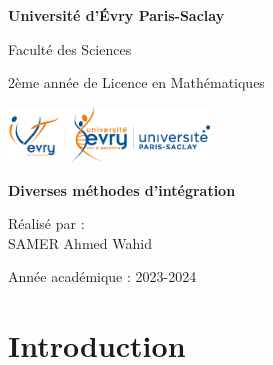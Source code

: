 \documentclass[12pt,a4paper]{article}
\begin{document}
\pagestyle{fancy}
	\renewcommand{\headrulewidth}{0.5pt}
    \fancyhead[L]{\chaptername\ \thechapter: \leftmark}

\begin{titlepage}
  \begin{center}

    \vspace*{1cm}

    \Large
    \textbf{Université d'Évry Paris-Saclay}

    \vspace{1.5cm}

    \large
    Faculté des Sciences

    \vspace{1.5cm}

    \large
    2ème année de Licence en Mathématiques

    \vspace{2cm}

    \includegraphics[width=0.4\textwidth]{logo_univ.png}

    \vspace{2cm}

    \Large
    \textbf{Diverses méthodes d’intégration}

    \vspace{2cm}

    \large
    Réalisé par :\\ SAMER Ahmed Wahid


    \vspace{2cm}

    \large
    Année académique : 2023-2024

  \end{center}
\end{titlepage}

\tableofcontents
    \thispagestyle{fancy}


\newpage
\section{Introduction}
\end{document}

